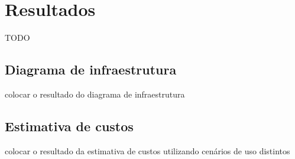 
\chapter{Resultados}
\label{cap:resultados}

TODO

\section{Diagrama de infraestrutura}
\label{sec:diagramaDeInfraestrutura}

colocar o resultado do diagrama de infraestrutura

\section{Estimativa de custos}
\label{sec:estimativaDeCustos}

colocar o resultado da estimativa de custos utilizando cenários de uso distintos

